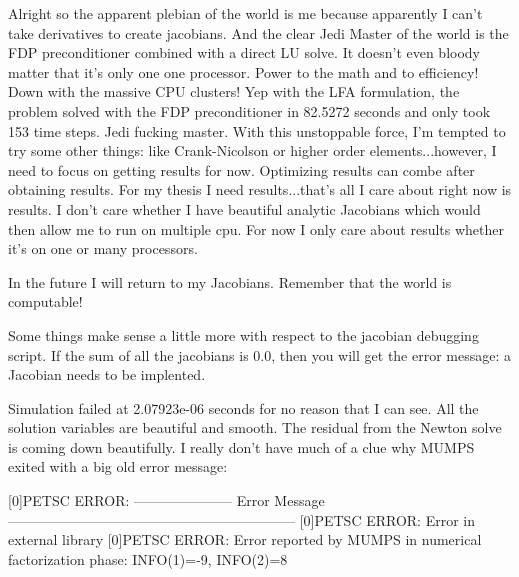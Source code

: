 {Alright so the apparent plebian of the world is me because apparently I can't take derivatives to create jacobians. And the clear Jedi Master of the world is the FDP preconditioner combined with a direct LU solve. It doesn't even bloody matter that it's only one one processor. Power to the math and to efficiency! Down with the massive CPU clusters! Yep with the LFA formulation, the problem solved with the FDP preconditioner in 82.5272 seconds and only took 153 time steps. Jedi fucking master. With this unstoppable force, I'm tempted to try some other things: like Crank-Nicolson or higher order elements...however, I need to focus on getting results for now. Optimizing results can combe after obtaining results. For my thesis I need results...that's all I care about right now is results. I don't care whether I have beautiful analytic Jacobians which would then allow me to run on multiple cpu. For now I only care about results whether it's on one or many processors.

In the future I will return to my Jacobians. Remember that the world is computable!

Some things make sense a little more with respect to the jacobian debugging script. If the sum of all the jacobians is 0.0, then you will get the error message: a Jacobian needs to be implented.

Simulation failed at 2.07923e-06 seconds for no reason that I can see. All the solution variables are beautiful and smooth. The residual from the Newton solve is coming down beautifully. I really don't have much of a clue why MUMPS exited with a big old error message:

[0]PETSC ERROR: --------------------- Error Message --------------------------------------------------------------
[0]PETSC ERROR: Error in external library
[0]PETSC ERROR: Error reported by MUMPS in numerical factorization phase: INFO(1)=-9, INFO(2)=8

}
